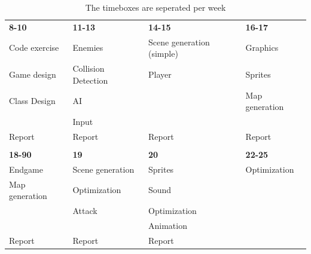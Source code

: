 \begin{table}[h]
\begin{tabular}{llll}
\rowcolor[HTML]{BBDAFF} 
{\color[HTML]{000000} \textbf{8-10}} & {\color[HTML]{000000} \textbf{11-13}} & {\color[HTML]{000000} \textbf{14-15}} & {\color[HTML]{000000} \textbf{16-17}} \\
Code exercise                        & Enemies                               & Scene generation (simple)             & Graphics                              \\
Game design                          & Collision Detection                   & Player                                & Sprites                               \\
Class Design                         & AI                                    &                                       & Map generation                        \\
                                     & Input                                 &                                       &                                       \\
Report                               & Report                                & Report                                & Report                                \\
                                     &                                       &                                       &                                       \\
\rowcolor[HTML]{BBDAFF} 
\textbf{18-90}                       & \textbf{19}                           & \textbf{20}                           & \textbf{22-25}                        \\
Endgame                              & Scene generation                      & Sprites                               & Optimization                          \\
Map generation                       & Optimization                          & Sound                                 &                                       \\
                                     & Attack                                & Optimization                          &                                       \\
                                     &                                       & Animation                             &                                       \\
Report                               & Report                                & Report                                &                                      
\end{tabular}
\caption{The timeboxes are seperated per week}
\end{table}
